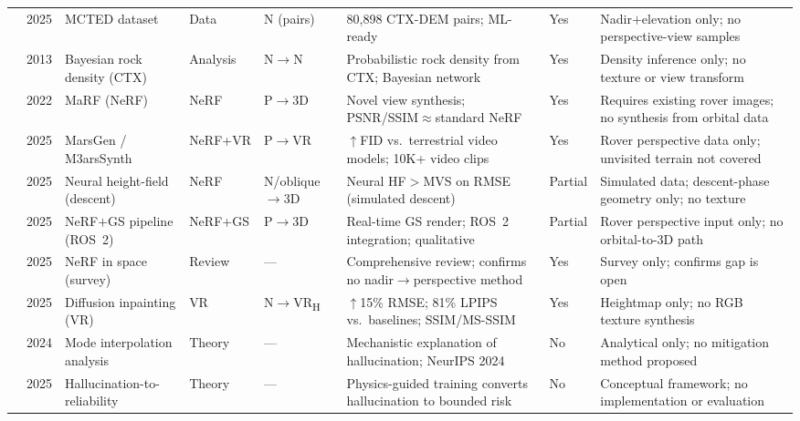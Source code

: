 \documentclass[10pt,journal]{IEEEtran}
\begin{document}
\begin{table}[!t]
\begin{tabular}{@{}p{0.45cm}lp{2.0cm}p{0.85cm}p{1.15cm}p{3.4cm}lp{4.4cm}@{}}
\cite{osadnik2025mcted} & 2025 & MCTED dataset                 & Data    & N (pairs) & 80,898 CTX-DEM pairs; ML-ready                                  & Yes     & Nadir$+$elevation only; no perspective-view samples \\
\cite{serrano2013hirise}& 2013 & Bayesian rock density (CTX)   & Analysis& N$\to$N   & Probabilistic rock density from CTX; Bayesian network           & Yes     & Density inference only; no texture or view transform \\
\midrule
\cite{giusti2022marf}   & 2022 & MaRF (NeRF)                   & NeRF    & P$\to$3D  & Novel view synthesis; PSNR/SSIM${\approx}$standard NeRF         & Yes     & Requires existing rover images; no synthesis from orbital data \\
\cite{li2025martian}    & 2025 & MarsGen / M3arsSynth          & NeRF+VR & P$\to$VR  & ${\uparrow}$FID vs.\ terrestrial video models; 10K+ video clips & Yes     & Rover perspective data only; unvisited terrain not covered \\
\cite{dealmeida2025neural3d} & 2025 & Neural height-field (descent) & NeRF & N/oblique$\to$3D & Neural HF$>$MVS on RMSE (simulated descent)               & Partial & Simulated data; descent-phase geometry only; no texture \\
\cite{martinezpetersen2025hifi} & 2025 & NeRF$+$GS pipeline (ROS~2) & NeRF+GS & P$\to$3D & Real-time GS render; ROS~2 integration; qualitative             & Partial & Rover perspective input only; no orbital-to-3D path \\
\cite{paul2025nerfspace}& 2025 & NeRF in space (survey)        & Review  & ---       & Comprehensive review; confirms no nadir$\to$perspective method  & Yes     & Survey only; confirms gap is open \\
\midrule
\cite{catalano2025inpainting} & 2025 & Diffusion inpainting (VR) & VR     & N$\to$VR\textsubscript{H} & ${\uparrow}$15\% RMSE; 81\% LPIPS vs.\ baselines; SSIM/MS-SSIM & Yes & Heightmap only; no RGB texture synthesis \\
\midrule
\cite{aithal2024hallucination} & 2024 & Mode interpolation analysis & Theory & --- & Mechanistic explanation of hallucination; NeurIPS 2024         & No      & Analytical only; no mitigation method proposed \\
\cite{rathkopf2025reliability} & 2025 & Hallucination-to-reliability & Theory & --- & Physics-guided training converts hallucination to bounded risk  & No      & Conceptual framework; no implementation or evaluation \\
\bottomrule
\end{tabular}
\end{table}
\end{document}
